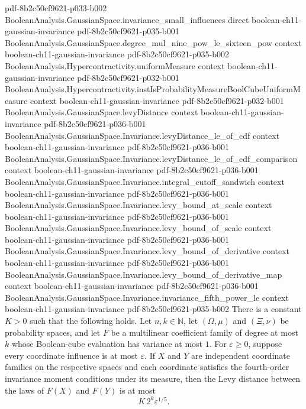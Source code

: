 \begin{theorem}
  {pdf-8b2c50cf9621-p033-b002}
\proofstep
  {BooleanAnalysis.GaussianSpace.invariance_small_influences}
  {direct}
  {boolean-ch11-gaussian-invariance}
  {pdf-8b2c50cf9621-p035-b001}
\proofstep
  {BooleanAnalysis.GaussianSpace.degree_mul_nine_pow_le_sixteen_pow}
  {context}
  {boolean-ch11-gaussian-invariance}
  {pdf-8b2c50cf9621-p035-b002}
\proofstep
  {BooleanAnalysis.Hypercontractivity.uniformMeasure}
  {context}
  {boolean-ch11-gaussian-invariance}
  {pdf-8b2c50cf9621-p032-b001}
\proofstep
  {BooleanAnalysis.Hypercontractivity.instIsProbabilityMeasureBoolCubeUniformMeasure}
  {context}
  {boolean-ch11-gaussian-invariance}
  {pdf-8b2c50cf9621-p032-b001}
\proofstep
  {BooleanAnalysis.GaussianSpace.levyDistance}
  {context}
  {boolean-ch11-gaussian-invariance}
  {pdf-8b2c50cf9621-p036-b001}
\proofstep
  {BooleanAnalysis.GaussianSpace.Invariance.levyDistance_le_of_cdf}
  {context}
  {boolean-ch11-gaussian-invariance}
  {pdf-8b2c50cf9621-p036-b001}
\proofstep
  {BooleanAnalysis.GaussianSpace.Invariance.levyDistance_le_of_cdf_comparison}
  {context}
  {boolean-ch11-gaussian-invariance}
  {pdf-8b2c50cf9621-p036-b001}
\proofstep
  {BooleanAnalysis.GaussianSpace.Invariance.integral_cutoff_sandwich}
  {context}
  {boolean-ch11-gaussian-invariance}
  {pdf-8b2c50cf9621-p036-b001}
\proofstep
  {BooleanAnalysis.GaussianSpace.Invariance.levy_bound_at_scale}
  {context}
  {boolean-ch11-gaussian-invariance}
  {pdf-8b2c50cf9621-p036-b001}
\proofstep
  {BooleanAnalysis.GaussianSpace.Invariance.levy_bound_of_scale}
  {context}
  {boolean-ch11-gaussian-invariance}
  {pdf-8b2c50cf9621-p036-b001}
\proofstep
  {BooleanAnalysis.GaussianSpace.Invariance.levy_bound_of_derivative}
  {context}
  {boolean-ch11-gaussian-invariance}
  {pdf-8b2c50cf9621-p036-b001}
\proofstep
  {BooleanAnalysis.GaussianSpace.Invariance.levy_bound_of_derivative_map}
  {context}
  {boolean-ch11-gaussian-invariance}
  {pdf-8b2c50cf9621-p036-b001}
\proofstep
  {BooleanAnalysis.GaussianSpace.Invariance.invariance_fifth_power_le}
  {context}
  {boolean-ch11-gaussian-invariance}
  {pdf-8b2c50cf9621-p035-b002}
There is a constant $K>0$ such that the following holds. Let $n,k\in\mathbb N$, let
$(\Omega,\mu)$ and $(\Xi,\nu)$ be probability spaces, and let $F$ be a multilinear
coefficient family of degree at most $k$ whose Boolean-cube evaluation has variance at
most $1$. For $\varepsilon\ge0$, suppose every coordinate influence is at most
$\varepsilon$. If $X$ and $Y$ are independent coordinate families on the respective
spaces and each coordinate satisfies the fourth-order invariance moment conditions under
its measure, then the Levy distance between the laws of $F(X)$ and $F(Y)$ is at most
\[
K\,2^k\varepsilon^{1/5}.
\]
\end{theorem}

